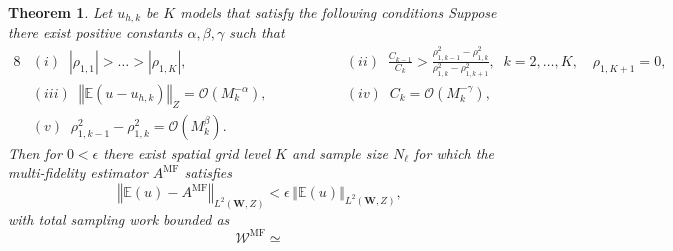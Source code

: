 \documentclass[final,3p,times,11pt]{elsarticle}
\newtheorem{theorem}{Theorem}%
\begin{document}
\begin{theorem}
\label{thm:Sample_cost_est}
Let $u_{h,k}$ be $K$ models that satisfy the following conditions
Suppose there exist positive constants $\alpha, \beta, \gamma$ such that
%
\begin{alignat*}{8}
    &(i)\;\; |\rho_{1,1}|>\ldots>|\rho_{1,K}|,& \qquad \qquad
    &(ii)\;\; \frac{C_{k-1}}{C_k}>\frac{\rho_{1,k-1}^2-\rho_{1,k}^2}{\rho_{1,k}^2-\rho_{1,k+1}^2},\;\;k=2,\ldots,K, \quad \rho_{1,K+1}=0,\\
    &(iii)\;\; \left\Vert\mathbb{E}\left(u-u_{h,k}\right)\right\Vert_Z=\mathcal{O}\left( M_k^{-\alpha}\right),& \qquad \qquad
    &(iv)\;\; C_k=\mathcal{O}\left( M_k^{-\gamma}\right),\\
    &(v)\;\; \rho_{1,k-1}^2-\rho_{1,k}^2=\mathcal{O}\left( M_k^{\beta}\right).
\end{alignat*}
%
%
Then for $0<\epsilon$ there exist spatial grid level $K$ and sample size $N_\ell$ for which the multi-fidelity estimator $A^{\text{MF}}$ satisfies
\[
\left\Vert\mathbb{E}(u)-A^{\text{MF}} \right\Vert_{L^2(\boldsymbol W,Z)}<\epsilon\,\left\Vert\mathbb{E}(u) \right\Vert_{L^2( \boldsymbol W,Z)},
\]
with total sampling work bounded as
\begin{equation*}
    \mathcal{W}^{\text{MF}} \simeq 
\end{equation*}
\end{theorem}
\end{document}
